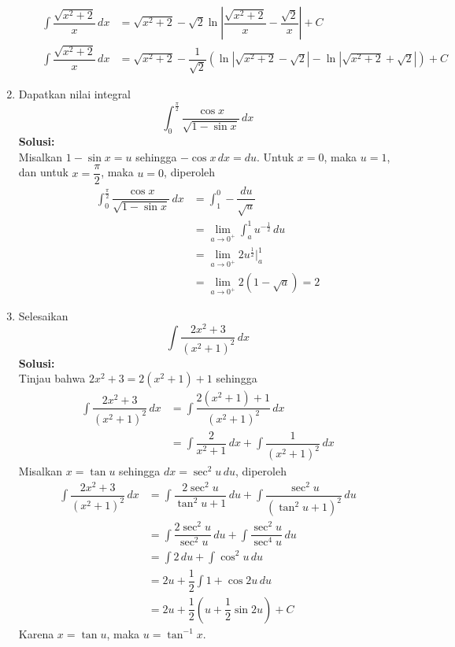 \documentclass{article}
\begin{document}
\begin{enumerate}
\begin{enumerate}[(i)]
\begin{align*}
\int \dfrac{\sqrt{x^2+2}}{x}\, dx &= \sqrt{x^2+2}-\sqrt{2}\ln\left|\dfrac{\sqrt{x^2+2}}{x}-\dfrac{\sqrt{2}}{x}\right| +C\\
\int \dfrac{\sqrt{x^2+2}}{x}\, dx &= \sqrt{x^2+2}-\dfrac{1}{\sqrt{2}}\left(\ln|\sqrt{x^2+2}-\sqrt{2}|-\ln|\sqrt{x^2+2}+\sqrt{2}|\right) +C
\end{align*}
\newpage
\end{enumerate}
	\item Dapatkan nilai integral  $$\int_0^{\frac{\pi}{2}}\dfrac{\cos x}{\sqrt{1-\sin x}}\, dx $$
	\textbf{Solusi:}\\
	Misalkan $1-\sin x=u$ sehingga $-\cos x\, dx = du$. Untuk $x=0$, maka $u=1$, dan untuk $x=\dfrac{
	\pi}{2}$, maka $u=0$, diperoleh
	\begin{align*}
	\int_0^{\frac{\pi}{2}}\dfrac{\cos x}{\sqrt{1-\sin x}}\, dx &= \int_1^0 -\dfrac{du}{\sqrt{u}}\\
	&= \lim_{a\rightarrow 0^+}\int_a^1 u^{-\frac{1}{2}} \, du\\
	&= \lim_{a\rightarrow 0^+} 2u^\frac{1}{2}\bigg|^1_a\\
	&= \lim_{a\rightarrow 0^+} 2(1-\sqrt{a})=2
	\end{align*}
	\item Selesaikan $$ \int \dfrac{2x^2+3}{(x^2+1)^2}\, dx$$
	\textbf{Solusi:}\\
	Tinjau bahwa $2x^2+3=2(x^2+1)+1$ sehingga 
	\begin{align*}
	\int \dfrac{2x^2+3}{(x^2+1)^2}\, dx &= \int \dfrac{2(x^2+1)+1}{(x^2+1)^2}\, dx\\
	&= \int \dfrac{2}{x^2+1}\, dx+\int \dfrac{1}{(x^2+1)^2}\, dx
	\end{align*}
	Misalkan $x=\tan u$ sehingga $dx=\sec^2 u\, du$, diperoleh 
	\begin{align*}
	\int \dfrac{2x^2+3}{(x^2+1)^2}\, dx &= \int \dfrac{2\sec^2 u}{\tan^2 u+1}\, du + \int \dfrac{\sec^2 u}{(\tan^2 u + 1)^2} \, du\\
	&= \int \dfrac{2\sec^2 u}{\sec^2 u} \, du + \int \dfrac{\sec^2 u}{\sec^4 u}\, du\\	
	&= \int 2\, du + \int \cos^2 u\, du\\
	&= 2u + \dfrac{1}{2}\int 1+\cos 2u \, du\\
	&= 2u + \dfrac{1}{2}\left(u+\dfrac{1}{2}\sin 2u\right) +C
	\end{align*}
	Karena $x=\tan u$, maka $u=\tan^{-1}x$. 
	\begin{center}
\end{center}
\end{enumerate}
\end{document}
